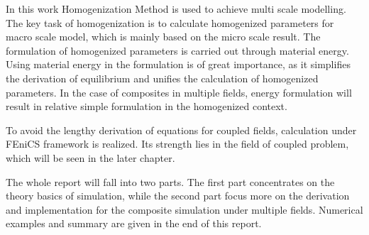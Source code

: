 In this work Homogenization Method is used to achieve multi scale modelling. The key task of homogenization is to calculate homogenized parameters for macro scale model, which is mainly based on the micro scale result. The formulation of homogenized parameters is carried out through material energy. Using material energy in the formulation is of great importance, as it simplifies the derivation of equilibrium and unifies the calculation of homogenized parameters. In the case of composites in multiple fields, energy formulation will result in relative simple formulation in the homogenized context. 

To avoid the lengthy derivation of equations for coupled fields, calculation under FEniCS framework is realized. Its strength lies in the field of coupled problem, which will be seen in the later chapter. 

The whole report will fall into two parts. The first part concentrates on the theory basics of simulation, while the second part focus more on the derivation and implementation for the composite simulation under multiple fields. Numerical examples and summary are given in the end of this report.

%
